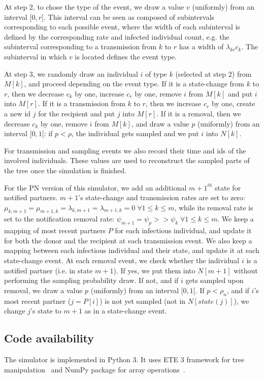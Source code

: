 \documentclass[a4paper,10pt]{article}
\begin{document}
At step 2, to chose the type of the event, we draw a value $v$ (uniformly) from an interval $[0, r[$. This interval can be seen as composed of subintervals corresponding to each possible event, where the width of each subinterval is defined by the corresponding rate and infected individual count, e.g. the subinterval corresponding to a transmission from $k$ to $r$ has a width of $\lambda_{kr}c_k$. The subinterval in which $v$ is located defines the event type.

At step 3, we randomly draw an individual $i$ of type $k$ (selected at step 2) from $M[k]$, and proceed depending on the event type. If it is a state-change from $k$ to $r$, then we decrease $c_k$ by one, increase $c_r$ by one, remove $i$ from $M[k]$ and put $i$ into $M[r]$. If it is a transmission from $k$ to $r$, then we increase $c_r$ by one, create a new id $j$ for the recipient and put $j$ into $M[r]$. If it is a removal, then we decrease $c_k$ by one, remove $i$ from $M[k]$, and draw a value $p$ (uniformly) from an interval $[0, 1[$: if $p < \rho$, the individual gets sampled and we put $i$ into $N[k]$. 

For transmission and sampling events we also record their time and ids of the involved individuals. These values are used to reconstruct the sampled parts of the tree once the simulation is finished.


For the PN version of this simulator, we add an additional $m+1^{th}$ state for notified partners. $m + 1$'s state-change and transmission rates are set to zero: $\mu_{k,m+1} = \mu_{m+1,k} = \lambda_{k,m+1} = \lambda_{m+1,k} = 0\; \forall 1 \leq k \leq m$, while its removal rate is set to the notification removal rate: $\psi_{m+1} = \psi_p >> \psi_k\; \forall 1 \leq k \leq m$. We keep a mapping of most recent partners $P$ for each infectious individual, and update it for both the donor and the recipient at each transmission event. We also keep a mapping between each infectious individual and their state, and update it at each state-change event. At each removal event, we check whether the individual $i$ is a notified partner (i.e. in state $m+1$). If yes, we put them into $N[m+1]$ without performing the sampling probability draw. If not, and if $i$ gets sampled upon removal, we draw a value $p$ (uniformly) from an interval $[0, 1[$. If $p < \rho_n$, and if $i$'s most recent partner ($j = P[i]$) is not yet sampled (not in $N[state(j)]$), we change $j$'s state to $m + 1$ as in a state-change event.


\subsection*{Code availability}
The simulator is implemented in Python 3. It uses ETE 3 framework for tree manipulation~\cite{Huerta-Cepas2016} and NumPy package for array operations~\cite{harris_array_2020}. 
\end{document}
